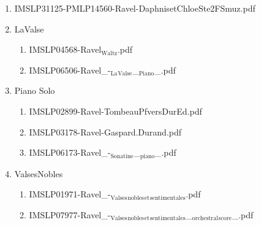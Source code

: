 \documentclass[11pt]{article}
\begin{document}
\begin{enumerate}
\item IMSLP31125-PMLP14560-Ravel-DaphnisetChloeSte2FSmuz.pdf
\label{sec-1-1-1-1-44-54-9}

\item LaValse
\label{sec-1-1-1-1-44-54-10}
\begin{enumerate}
\item IMSLP04568-Ravel$_{\text{Waltz}}$.pdf
\label{sec-1-1-1-1-44-54-10-1}

\item IMSLP06506-Ravel\_-$_{\text{La}}$$_{\text{Valse}}$\_$_{\text{Piano}}$\_.pdf
\label{sec-1-1-1-1-44-54-10-2}
\end{enumerate}

\item Piano Solo
\label{sec-1-1-1-1-44-54-11}
\begin{enumerate}
\item IMSLP02899-Ravel-TombeauPfversDurEd.pdf
\label{sec-1-1-1-1-44-54-11-1}

\item IMSLP03178-Ravel-Gaspard.Durand.pdf
\label{sec-1-1-1-1-44-54-11-2}

\item IMSLP06173-Ravel\_-$_{\text{Sonatine}}$\_$_{\text{piano}}$\_.pdf
\label{sec-1-1-1-1-44-54-11-3}
\end{enumerate}

\item ValsesNobles
\label{sec-1-1-1-1-44-54-12}
\begin{enumerate}
\item IMSLP01971-Ravel\_-$_{\text{Valses}}$$_{\text{nobles}}$$_{\text{et}}$$_{\text{sentimentales}}$.pdf
\label{sec-1-1-1-1-44-54-12-1}

\item IMSLP07977-Ravel\_-$_{\text{Valses}}$$_{\text{nobles}}$$_{\text{et}}$$_{\text{sentimentales}}$\_$_{\text{orchestral}}$$_{\text{score}}$\_.pdf
\label{sec-1-1-1-1-44-54-12-2}
\end{enumerate}
\end{enumerate}
\end{document}
